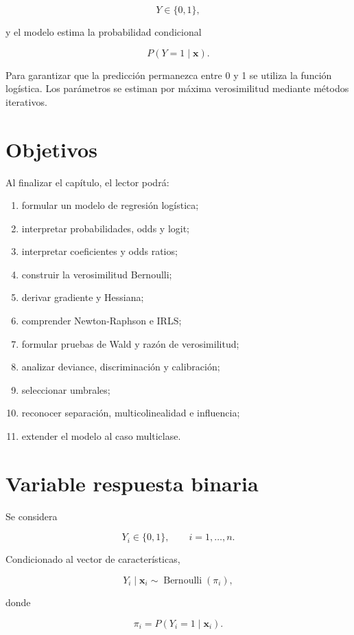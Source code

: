 \documentclass[
  spanish,
  11pt,
  letterpaper,
  DIV=11,
  numbers=noendperiod]{scrreprt}
\providecommand{\tightlist}{%
  \setlength{\itemsep}{0pt}\setlength{\parskip}{0pt}}
\theoremstyle{definition}
\theoremstyle{plain}
\theoremstyle{definition}
\theoremstyle{remark}
\begin{document}
\[
Y\in\{0,1\},
\]

y el modelo estima la probabilidad condicional

\[
P(Y=1\mid\mathbf{x}).
\]

Para garantizar que la predicción permanezca entre 0 y 1 se utiliza la
función logística. Los parámetros se estiman por máxima verosimilitud
mediante métodos iterativos.

\section{Objetivos}\label{objetivos-10}

Al finalizar el capítulo, el lector podrá:

\begin{enumerate}
\def\labelenumi{\arabic{enumi}.}
\tightlist
\item
  formular un modelo de regresión logística;
\item
  interpretar probabilidades, odds y logit;
\item
  interpretar coeficientes y odds ratios;
\item
  construir la verosimilitud Bernoulli;
\item
  derivar gradiente y Hessiana;
\item
  comprender Newton-Raphson e IRLS;
\item
  formular pruebas de Wald y razón de verosimilitud;
\item
  analizar deviance, discriminación y calibración;
\item
  seleccionar umbrales;
\item
  reconocer separación, multicolinealidad e influencia;
\item
  extender el modelo al caso multiclase.
\end{enumerate}

\section{Variable respuesta binaria}\label{variable-respuesta-binaria}

Se considera

\[
Y_i\in\{0,1\},
\qquad i=1,\ldots,n.
\]

Condicionado al vector de características,

\[
Y_i\mid\mathbf{x}_i
\sim
\operatorname{Bernoulli}(\pi_i),
\]

donde

\[
\pi_i=P(Y_i=1\mid\mathbf{x}_i).
\]
\end{document}
